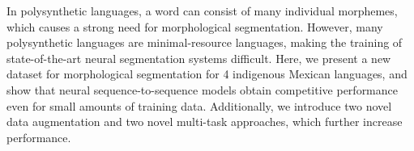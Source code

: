 In polysynthetic languages, a word can consist of many individual morphemes, which causes a strong need for morphological segmentation. However, many polysynthetic languages are minimal-resource languages, making the training of state-of-the-art neural segmentation systems difficult. Here, we present a new dataset for morphological segmentation for 4 indigenous Mexican languages, and show that neural sequence-to-sequence models obtain competitive performance even for small amounts of training data. Additionally, we introduce two novel data augmentation and two novel multi-task approaches, which further increase performance.
